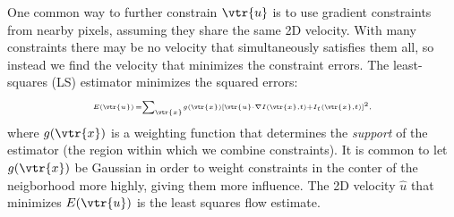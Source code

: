 \begin{compactdesc}
	One common way to further constrain $\vtr{u}$ is to use gradient constraints from nearby pixels, assuming they share the same 2D velocity. With many constraints there may be no velocity that simultaneously satisfies them all, so instead we find the velocity that minimizes the constraint errors. The least-squares (LS) estimator minimizes the squared errors:
	\begin{gather}\scriptscriptstyle
		E(\vtr{u})\,=\sum_{\vtr{x}}^{}\!g(\vtr{x})\left[ \vtr{u}\cdot \nabla I(\vtr{x},t)+I_t(\vtr{x},t) \right]^2,
		\label{eq:minsquarederrors}
	\end{gather}
	where $g(\vtr{x})$ is a weighting function that determines the \emph{support} of the estimator (the region within which we combine constraints). It is common to let $g(\vtr{x})$ be Gaussian in order to weight constraints in the conter of the neigborhood more highly, giving them more influence. The 2D velocity $\hat{u}$ that minimizes $E(\vtr{u})$ is the least squares flow estimate.


\end{compactdesc}
